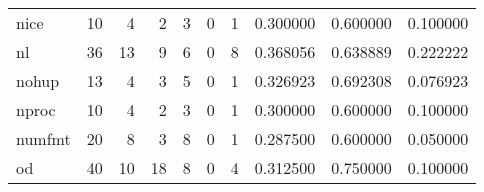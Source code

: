\begin{longtable}{lrrrrrrrrr}
nice      &                                      10 &                                                  4 &                                                  2 &                                                  3 &                                                  0 &                                                  1 &                                           0.300000 &                               0.600000 &                             0.100000 \\
nl        &                                      36 &                                                 13 &                                                  9 &                                                  6 &                                                  0 &                                                  8 &                                           0.368056 &                               0.638889 &                             0.222222 \\
nohup     &                                      13 &                                                  4 &                                                  3 &                                                  5 &                                                  0 &                                                  1 &                                           0.326923 &                               0.692308 &                             0.076923 \\
nproc     &                                      10 &                                                  4 &                                                  2 &                                                  3 &                                                  0 &                                                  1 &                                           0.300000 &                               0.600000 &                             0.100000 \\
numfmt    &                                      20 &                                                  8 &                                                  3 &                                                  8 &                                                  0 &                                                  1 &                                           0.287500 &                               0.600000 &                             0.050000 \\
od        &                                      40 &                                                 10 &                                                 18 &                                                  8 &                                                  0 &                                                  4 &                                           0.312500 &                               0.750000 &                             0.100000 \\

\end{longtable}
